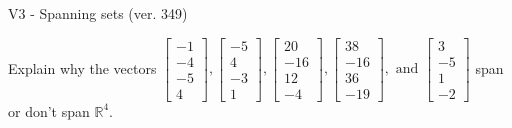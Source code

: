 \begin{exercise}
  \begin{exerciseTitle}V3 - Spanning sets (ver. 349)\end{exerciseTitle}
  \begin{exerciseStatement}
    Explain why the vectors \(\left[\begin{array}{r}
-1 \\
-4 \\
-5 \\
4
\end{array}\right] , \left[\begin{array}{r}
-5 \\
4 \\
-3 \\
1
\end{array}\right] , \left[\begin{array}{r}
20 \\
-16 \\
12 \\
-4
\end{array}\right] , \left[\begin{array}{r}
38 \\
-16 \\
36 \\
-19
\end{array}\right] , \text{ and } \left[\begin{array}{r}
3 \\
-5 \\
1 \\
-2
\end{array}\right]\) span or don't span \(\mathbb{R}^4\). 
	



\end{exerciseStatement}
\end{exercise}
